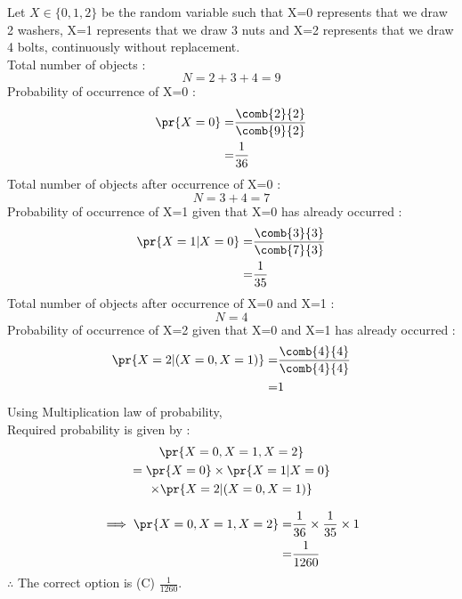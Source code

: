 
Let $X\in\{0,1,2\}$ be the random variable such that X=0 represents that we draw 2 washers, X=1 represents that we draw 3 nuts and X=2 represents that we draw 4 bolts, continuously without replacement. \\
Total number of objects :
\begin{equation}
    N = 2+ 3+ 4 = 9
\end{equation}
Probability of occurrence of X=0 :
\begin{align}
    \pr{X=0} =& \dfrac{\comb{2}{2}}{\comb{9}{2}} \\
     =& \dfrac{1}{36}    
\end{align}
Total number of objects after occurrence of X=0 :
\begin{equation}
    N = 3+ 4 = 7
\end{equation}
Probability of occurrence of X=1 given that X=0 has already occurred :
\begin{align}
    \pr{X=1|X=0} =& \dfrac{\comb{3}{3}}{\comb{7}{3}}\\
   =& \dfrac{1}{35} 
\end{align}
Total number of objects after occurrence of X=0 and X=1 :
\begin{equation}
    N = 4 
\end{equation}
Probability of occurrence of X=2 given that X=0 and X=1 has already occurred :
\begin{align}
    \pr{X=2|(X=0,X=1)} =&\dfrac{\comb{4}{4}}{\comb{4}{4}} \\
     =& 1
\end{align}
Using Multiplication law of probability,\\ Required probability is given by :
\begin{multline}
    \pr{X=0 , X=1 , X=2} \\
      = \pr{X=0}\times \pr{X=1|X=0}\\\times \pr{X=2|(X=0,X=1)}
    \end{multline}
    
\begin{align}
\implies\pr{X=0 , X=1 , X=2} =& \frac{1}{36}\times\frac{1}{35}\times1 \\
=& \frac{1}{1260}
\end{align}
$\therefore$ The correct option is (C) \large $\frac{1}{1260}$.
